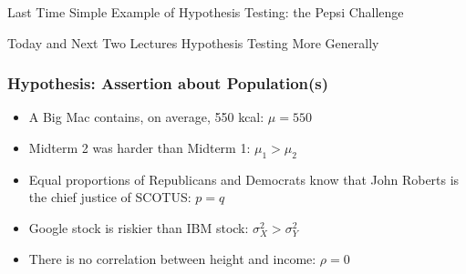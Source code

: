 \documentclass[handout]{beamer}
\date{Lecture 21}
\begin{document}
 





\begin{frame}[plain]
	\titlepage 
	

\end{frame} 


\begin{frame}
\begin{block}{Last Time}
Simple Example of Hypothesis Testing: the Pepsi Challenge
\end{block}

\begin{block}{Today and Next Two Lectures}
Hypothesis Testing More Generally
\end{block}

\end{frame}

\begin{frame}
\frametitle{Hypothesis: Assertion about Population(s)}
	\begin{itemize}
	\item A Big Mac contains, on average, 550 kcal: \alert{$\mu = 550$}
	\item Midterm 2 was harder than Midterm 1: \alert{$\mu_{1} >\mu_2$}
	\item Equal proportions of Republicans and Democrats know that John Roberts is the chief justice of SCOTUS: \alert{$p = q$}
	\item Google stock is riskier than IBM stock: \alert{$\sigma^2_{X} > \sigma^2_{Y}$}
	\item There is no correlation between height and income: \alert{$\rho = 0$} 
	\end{itemize}
\end{frame}
\end{document}
